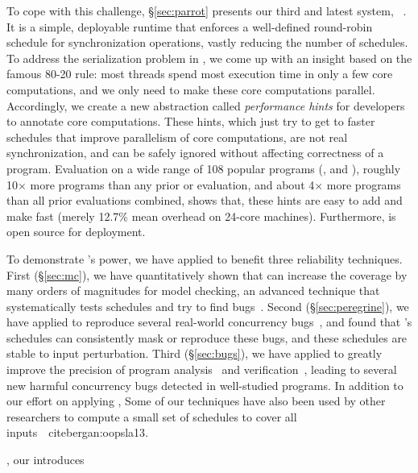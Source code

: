 To cope with this challenge, \S\ref{sec:parrot} presents our third and latest
\smt system, 
\parrot~\cite{parrot:sosp13}. It is a simple, deployable runtime that enforces a
well-defined
round-robin schedule for synchronization operations, vastly reducing the number
of
schedules. To address the serialization problem in \smt,
we come up with an insight based on the famous 80-20 rule: most threads spend
most 
execution time in only a few core computations, and we only need to make 
these core computations parallel. Accordingly, we create a 
new abstraction called \emph{performance hints} for developers to 
annotate core computations. These hints, which just try to get to faster
schedules that improve 
parallelism of core computations, are not real 
synchronization, and can be safely ignored without affecting correctness of a 
program. Evaluation on a wide range of 108 popular programs (\eg, \bdb and
\mplayer),
roughly 10$\times$ more programs than any prior \smt or 
\dmt evaluation, and about 4$\times$ more programs than all prior evaluations
combined, 
shows that, these hints are easy to add and make \parrot fast
(merely 12.7\% mean overhead on 24-core machines). Furthermore, \parrot is open
source for deployment.

To demonstrate \smt's power, we have applied \smt to benefit three reliability
techniques. First (\S\ref{sec:mc}), we have quantitatively shown that \smt can
increase the coverage by many orders of magnitudes for model checking, an
advanced technique that systematically tests schedules and try to find
bugs~\cite{parrot:sosp13, dbug:spin11, modist:nsdi09}. Second
(\S\ref{sec:peregrine}), we have applied \smt to reproduce several real-world
concurrency bugs~\cite{cui:tern:osdi10}, and found that \smt's schedules can
consistently mask or reproduce these bugs, and these schedules are stable to
input perturbation. Third (\S\ref{sec:bugs}), we have applied \smt to greatly
improve the precision of program analysis~\cite{wu:pldi12} and
verification~\cite{wu:pldi12}, leading to several new harmful concurrency bugs
detected in well-studied programs. In addition to our effort on applying \smt,
Some of our \smt techniques have also been used by other researchers to compute
a small set of schedules to cover all inputs~\
cite{bergan:oopsla13}.

\tern, 
our 
introduces 

